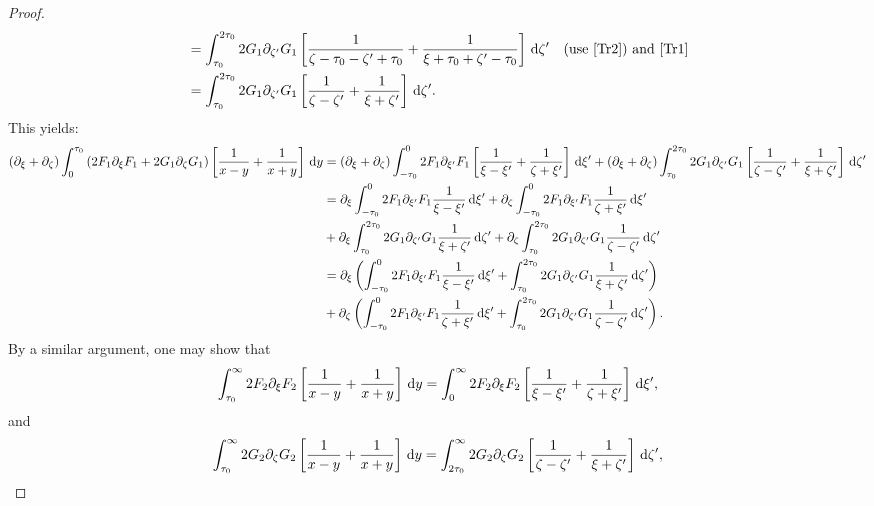 \documentclass[10pt,reqno,oneside,a4paper, landscape]{article}
\begin{document}
\begin{proof}
\begin{align*}
&= \int_{\tau_0}^{2\tau_0} 2 G_1\partial_{\zeta'} G_1 \left[ \frac{1}{\zeta - \tau_0 -\zeta' + \tau_0} +\frac{1}{\xi + \tau_0 +\zeta' - \tau_0} \right] \,\mathrm{d} \zeta' &\text{(use \eqref{Tr2}) and \eqref{Tr1}} \\
&= \int_{\tau_0}^{2\tau_0} 2 G_1 \partial_{\zeta'} G_1 \left[ \frac{1}{\zeta - \zeta'} + \frac{1}{\xi + \zeta'} \right] \,\mathrm{d} \zeta'.
\end{align*}
This yields:
\begin{align}
(\partial_\xi + \partial_\zeta) \int_0^{\tau_0} \left( 2 F_1  \partial_\xi F_1 + 2 G_1 \partial_\zeta G_1 \right) \left[ \frac{1}{x-y} + \frac{1}{x+y} \right] \,\mathrm{d} y &= (\partial_\xi + \partial_\zeta)\int^{0}_{-\tau_0} 2 F_1\partial_{\xi'}F_1 \left[ \frac{1}{\xi -\xi'} + \frac{1}{\zeta +\xi'} \right] \,\mathrm{d} \xi'  + (\partial_\xi + \partial_\zeta)\int_{\tau_0}^{2\tau_0} 2 G_1 \partial_{\zeta'} G_1 \left[ \frac{1}{\zeta - \zeta'} + \frac{1}{\xi + \zeta'} \right] \,\mathrm{d} \zeta' \nonumber \\
&= \partial_\xi \int^{0}_{-\tau_0} 2 F_1\partial_{\xi'}F_1 \frac{1}{\xi -\xi'} \,\mathrm{d} \xi'  + \partial_\zeta \int^{0}_{-\tau_0} 2 F_1\partial_{\xi'}F_1 \frac{1}{\zeta +\xi'} \,\mathrm{d} \xi' \nonumber\\
&+ \partial_\xi \int_{\tau_0}^{2\tau_0} 2 G_1 \partial_{\zeta'} G_1 \frac{1}{\xi + \zeta'} \,\mathrm{d} \zeta' + \partial_\zeta \int_{\tau_0}^{2\tau_0} 2 G_1 \partial_{\zeta'} G_1 \frac{1}{\zeta - \zeta'} \,\mathrm{d} \zeta' \nonumber \\
&= \partial_\xi \left( \int^{0}_{-\tau_0} 2 F_1\partial_{\xi'}F_1  \frac{1}{\xi -\xi'} \,\mathrm{d} \xi' + \int_{\tau_0}^{2\tau_0} 2 G_1 \partial_{\zeta'} G_1 \frac{1}{\xi + \zeta'} \,\mathrm{d} \zeta' \right)  \nonumber\\
&+\partial_\zeta \left( \int^{0}_{-\tau_0} 2 F_1\partial_{\xi'}F_1 \frac{1}{\zeta +\xi'} \,\mathrm{d} \xi' + \int_{\tau_0}^{2\tau_0} 2 G_1 \partial_{\zeta'} G_1 \frac{1}{\zeta - \zeta'} \,\mathrm{d} \zeta' \right) \label{Tr5}.
\end{align}
By a similar argument, one may show that 
\begin{align*}
\int_{\tau_0}^\infty 2 F_2 \partial_\xi F_2 \left[ \frac{1}{x-y} + \frac{1}{x+y} \right] \,\mathrm{d} y = \int_{0}^\infty 2 F_2 \partial_\xi F_2 \left[ \frac{1}{\xi - \xi'} + \frac{1}{\zeta + \xi'} \right] \,\mathrm{d} \xi',
\end{align*}
and 
\begin{align*}
\int_{\tau_0}^\infty 2 G_2 \partial_\zeta G_2 \left[ \frac{1}{x-y} + \frac{1}{x+y} \right] \D y = \int_{2\tau_0}^{\infty} 2 G_2 \partial_\zeta G_2 \left[ \frac{1}{\zeta - \zeta'} + \frac{1}{\xi + \zeta'}\right] \D \zeta', 

\end{align*}
\end{proof}
\end{document}

